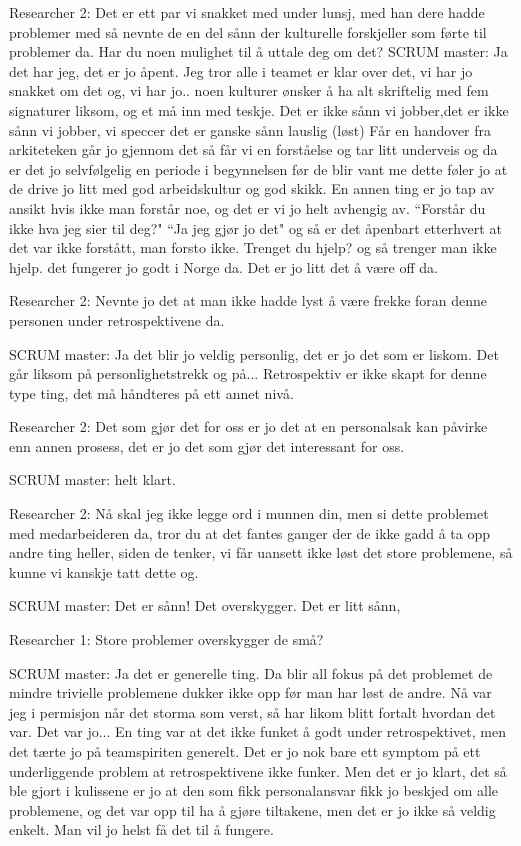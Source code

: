 Researcher 2: Det er ett par vi snakket med under lunsj, med han dere hadde problemer med så nevnte de en del sånn der kulturelle forskjeller som førte til problemer da. Har du noen mulighet til å uttale deg om det?
SCRUM master: Ja det har jeg, det er jo åpent. Jeg tror alle i teamet er klar over det, vi har jo snakket om det og, vi har jo.. noen kulturer ønsker å ha alt skriftelig med fem signaturer liksom, og et må inn med teskje. Det er ikke sånn vi jobber,det er ikke sånn vi jobber, vi speccer det er ganske sånn lauslig (løst) Får en handover fra arkiteteken går jo gjennom det så får vi en forståelse og tar litt underveis og da er det jo selvfølgelig en periode i begynnelsen før de blir vant me dette føler jo at de drive jo litt med god arbeidskultur og god skikk. En annen ting er jo tap av ansikt hvis ikke man forstår noe, og det er vi jo helt avhengig av. ``Forstår du ikke hva jeg sier til deg?" ``Ja jeg gjør jo det" og så er det åpenbart etterhvert at det var ikke forstått, man forsto ikke. Trenget du hjelp? og så trenger man ikke hjelp. det fungerer jo godt i Norge da. Det er jo litt det å være off da.

Researcher 2: Nevnte jo det at man ikke hadde lyst å være frekke foran denne personen under retrospektivene da.

SCRUM master: Ja det blir jo veldig personlig, det er jo det som er liskom. Det går liksom på personlighetstrekk og på... Retrospektiv er ikke skapt for denne type ting, det må håndteres på ett annet nivå.

Researcher 2: Det som gjør det for oss er jo det at en personalsak kan påvirke enn annen prosess, det er jo det som gjør det interessant for oss.

SCRUM master: helt klart.

Researcher 2: Nå skal jeg ikke legge ord i munnen din, men si dette problemet med medarbeideren da, tror du at det fantes ganger der de ikke gadd å ta opp andre ting heller, siden de tenker, vi får uansett ikke løst det store problemene, så kunne vi kanskje tatt dette og.

SCRUM master: Det er sånn! Det overskygger. Det er litt sånn,

Researcher 1: Store problemer overskygger de små?

SCRUM master: Ja det er generelle ting. Da blir all fokus på det problemet de mindre trivielle problemene dukker ikke opp før man har løst de andre. Nå var jeg i permisjon når det storma som verst, så har likom blitt fortalt hvordan det var. Det var jo... En ting var at det ikke funket å godt under retrospektivet, men det tærte jo på teamspiriten generelt. Det er jo nok bare ett symptom på ett underliggende problem at retrospektivene ikke funker. Men det er jo klart, det så ble gjort i kulissene er jo at den som fikk personalansvar fikk jo beskjed om alle problemene, og det var opp til ha å gjøre tiltakene, men det er jo ikke så veldig enkelt. Man vil jo helst få det til å fungere.

